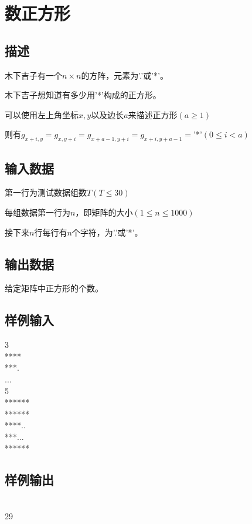 \ifx\allfiles\undefined

\fi


\section{数正方形}
\subsection*{描述}
木下吉子有一个$n\times n$的方阵，元素为'.'或'*'。

木下吉子想知道有多少用'*'构成的正方形。

可以使用左上角坐标$x,y$以及边长$a$来描述正方形$(a\geqslant 1)$

则有$g_{x+i,y}=g_{x,y+i}=g_{x+a-1,y+i}=g_{x+i,y+a-1}=$'*'$(0\leqslant i<a)$

\subsection*{输入数据}
第一行为测试数据组数$T(T\leqslant 30)$

每组数据第一行为$n$，即矩阵的大小$(1\leqslant n\leqslant 1000)$

接下来$n$行每行有$n$个字符，为'.'或'*'。

\subsection*{输出数据}
给定矩阵中正方形的个数。

\subsection*{样例输入}
3\\
****\\
***.\\
...\\
5 \\
****** \\
****** \\
****.. \\
***... \\
******

\subsection*{样例输出}
\\
29


\ifx\allfiles\undefined

\fi